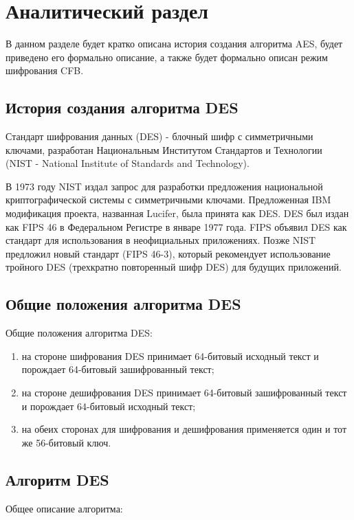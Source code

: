 \chapter{Аналитический раздел}

В данном разделе будет кратко описана история создания алгоритма AES, будет приведено его формально описание, а также будет формально описан режим шифрования CFB.

\section{История создания алгоритма DES}

Стандарт шифрования данных (DES) - блочный шифр с симметричными ключами, разработан Национальным Институтом Стандартов и Технологии (NIST - National Institute
of Standards and Technology).

В 1973 году NIST издал запрос для разработки предложения национальной криптографической системы с симметричными ключами. Предложенная IBM модификация проекта, названная Lucifer, была принята как DES. DES был издан как FIPS 46 в Федеральном Регистре в январе 1977 года.
FIPS объявил DES как стандарт для использования в неофициальных приложениях. Позже NIST предложил новый стандарт (FIPS 46-3), который рекомендует использование тройного DES (трехкратно повторенный шифр DES) для будущих приложений.

\section{Общие положения алгоритма DES}

Общие положения алгоритма DES:

\begin{enumerate}
	\item на стороне шифрования DES принимает 64-битовый исходный текст и порождает
	64-битовый зашифрованный текст;
	\item на стороне дешифрования DES принимает 64-битовый зашифрованный текст и порождает 64-битовый исходный текст;
	\item на обеих сторонах для шифрования и дешифрования применяется один и тот же
	56-битовый ключ.
\end{enumerate}

\section{Алгоритм DES}

Общее описание алгоритма:

